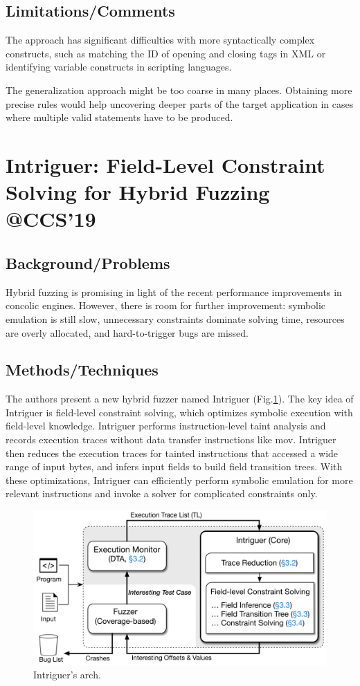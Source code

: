 \subsection{Limitations/Comments}
The approach has significant difficulties with more syntactically complex constructs, such as matching the ID of opening and closing tags in XML or identifying variable constructs in scripting languages. 

The generalization approach might be too coarse in many places. Obtaining more precise rules would help uncovering deeper parts of the target application in cases where multiple valid statements have to be produced. 
\newpage
\section{Intriguer: Field-Level Constraint Solving for Hybrid Fuzzing @CCS'19}
\subsection{Background/Problems}
Hybrid fuzzing is promising in light of the recent performance improvements in concolic engines. However, there is room for further improvement: symbolic emulation is still slow, unnecessary constraints dominate solving time, resources are overly allocated, and hard-to-trigger bugs are missed.

\subsection{Methods/Techniques}
The authors present a new hybrid fuzzer named Intriguer (Fig.\ref{fig:intriguer}). The key idea of Intriguer is field-level constraint solving, which optimizes symbolic execution with field-level knowledge. Intriguer performs instruction-level taint analysis and records execution traces without data transfer instructions like mov. Intriguer then reduces the execution traces for tainted instructions that accessed a wide range of input bytes, and infers input fields to build field transition trees. With these optimizations, Intriguer can efficiently perform symbolic emulation for more relevant instructions and invoke a solver for complicated constraints only.

\begin{figure}[h]
    \centering
    \includegraphics[width=\linewidth]{intriguer.png} %
    \caption{Intriguer's arch.}	
    \label{fig:intriguer}
\end{figure}
